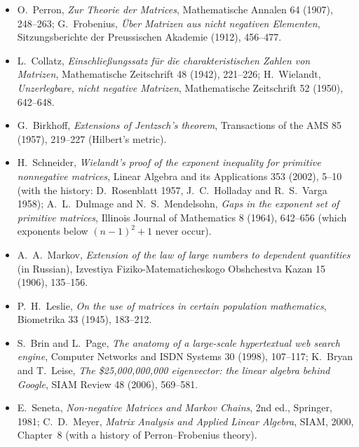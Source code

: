 \begin{itemize}
\item O.~Perron, \emph{Zur Theorie der Matrices}, Mathematische Annalen 64 (1907), 248--263; G.~Frobenius, \emph{\"Uber Matrizen aus
nicht negativen Elementen}, Sitzungsberichte der Preussischen Akademie (1912), 456--477.
\item L.~Collatz, \emph{Einschlie\ss ungssatz f\"ur die charakteristischen Zahlen von Matrizen}, Mathematische Zeitschrift 48
(1942), 221--226; H.~Wielandt, \emph{Unzerlegbare, nicht negative Matrizen}, Mathematische Zeitschrift 52 (1950), 642--648.
\item G.~Birkhoff, \emph{Extensions of Jentzsch's theorem}, Transactions of the AMS 85 (1957), 219--227 (Hilbert's metric).
\item H.~Schneider, \emph{Wielandt's proof of the exponent inequality for primitive nonnegative matrices}, Linear Algebra and its
Applications 353 (2002), 5--10 (with the history: D.~Rosenblatt 1957, J.~C.~Holladay and R.~S.~Varga 1958); A.~L.~Dulmage and
N.~S.~Mendelsohn, \emph{Gaps in the exponent set of primitive matrices}, Illinois Journal of Mathematics 8 (1964), 642--656 (which
exponents below $(n-1)^2+1$ never occur).
\item A.~A.~Markov, \emph{Extension of the law of large numbers to dependent quantities} (in Russian), Izvestiya
Fiziko-Matematicheskogo Obshchestva Kazan 15 (1906), 135--156.
\item P.~H.~Leslie, \emph{On the use of matrices in certain population mathematics}, Biometrika 33 (1945), 183--212.
\item S.~Brin and L.~Page, \emph{The anatomy of a large-scale hypertextual web search engine}, Computer Networks and ISDN Systems
30 (1998), 107--117; K.~Bryan and T.~Leise, \emph{The \$25{,}000{,}000{,}000 eigenvector: the linear algebra behind Google},
SIAM Review 48 (2006), 569--581.
\item E.~Seneta, \emph{Non-negative Matrices and Markov Chains}, 2nd ed., Springer, 1981; C.~D.~Meyer, \emph{Matrix Analysis and
Applied Linear Algebra}, SIAM, 2000, Chapter~8 (with a history of Perron--Frobenius theory).
\end{itemize}

